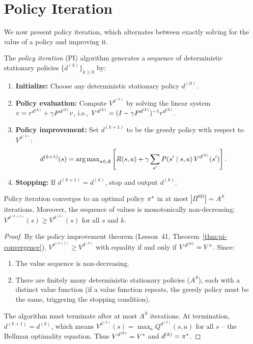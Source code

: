 \documentclass[11pt,a4paper]{article}
\begin{document}

\section{Policy Iteration}
\label{sec:policy-iteration}

We now present policy iteration, which alternates between exactly
solving for the value of a policy and improving it.

\begin{definition}
\label{def:pi}
The \emph{policy iteration} (PI) algorithm generates a sequence of
deterministic stationary policies $\{d^{(k)}\}_{k \geq 0}$ by:
\begin{enumerate}[nosep]
    \item \textbf{Initialize:} Choose any deterministic stationary
    policy $d^{(0)}$.
    \item \textbf{Policy evaluation:} Compute $V^{d^{(k)}}$ by
    solving the linear system
    $v = r^{d^{(k)}} + \gamma P^{d^{(k)}} v$, i.e.,
    $V^{d^{(k)}} = (I - \gamma P^{d^{(k)}})^{-1} r^{d^{(k)}}$.
    \item \textbf{Policy improvement:} Set $d^{(k+1)}$ to be the
    greedy policy with respect to $V^{d^{(k)}}$:
    \[
        d^{(k+1)}(s) = \operatorname{arg\,max}_{a \in \mathcal{A}}
        \left[ R(s,a) + \gamma \sum_{s'} P(s' \mid s,a)\,
        V^{d^{(k)}}(s') \right].
    \]
    \item \textbf{Stopping:} If $d^{(k+1)} = d^{(k)}$, stop and
    output $d^{(k)}$.
\end{enumerate}
\end{definition}

\begin{theorem}
\label{thm:pi-convergence}
Policy iteration converges to an optimal policy $\pi^*$ in at
most $|\Pi^{\mathrm{SD}}| = A^S$ iterations. Moreover, the sequence
of values is monotonically non-decreasing:
$V^{d^{(k+1)}}(s) \geq V^{d^{(k)}}(s)$ for all $s$ and $k$.
\end{theorem}

\begin{proof}
By the policy improvement theorem (Lesson~41,
Theorem~\ref{thm:pi-convergence}), $V^{d^{(k+1)}} \geq V^{d^{(k)}}$
with equality if and only if $V^{d^{(k)}} = V^*$. Since:
\begin{enumerate}[nosep]
    \item The value sequence is non-decreasing.
    \item There are finitely many deterministic stationary policies
    ($A^S$), each with a distinct value function (if a value function
    repeats, the greedy policy must be the same, triggering the
    stopping condition).
\end{enumerate}
The algorithm must terminate after at most $A^S$ iterations.
At termination, $d^{(k+1)} = d^{(k)}$, which means
$V^{d^{(k)}}(s) = \max_a Q^{d^{(k)}}(s,a)$ for all $s$ --
the Bellman optimality equation. Thus $V^{d^{(k)}} = V^*$ and
$d^{(k)} = \pi^*$.
\end{proof}
\end{document}
